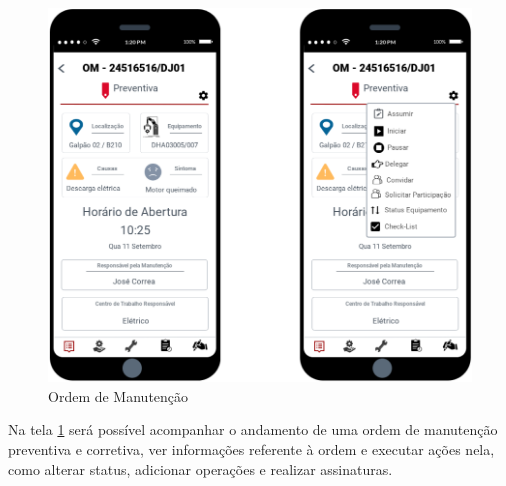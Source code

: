 \begin{figure}[H]
	\caption{\label{mobile_om}Ordem de Manutenção}
	\begin{center}
		\includegraphics[scale=0.70]{./Figuras/mobile/om.png}
	\end{center}
\end{figure}

Na tela \ref{mobile_om} será possível acompanhar o andamento de uma ordem de manutenção preventiva e corretiva, ver informações referente à ordem e executar ações nela, como alterar status, adicionar operações e realizar assinaturas.